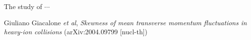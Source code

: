 \documentclass[letterpaper,aps,prc,superscriptaddress,nofootinbib,10pt,showpacs,floatfix]{revtex4-2}%
\begin{document}
The study of  $\cdots$


\begin{thebibliography}{50}
\medskip


  

  Giuliano Giacalone {\it et al}, \textit{Skewness of mean transverse momentum fluctuations in heavy-ion collisions} (arXiv:2004.09799 [nucl-th])

\end{thebibliography}
\end{document}
